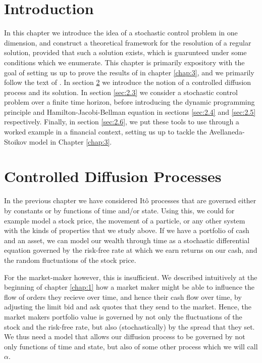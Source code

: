 \section{Introduction}
In this chapter we introduce the idea of a stochastic control problem in one dimension, 
and construct a theoretical framework for the resolution of a regular solution, 
provided that such a solution exists, which is guarunteed under some conditions which
we enumerate. This chapter is primarily expository with the goal of setting us up 
to prove the results of \cite{AS2008} in chapter \ref{chap:3}, and we primarily follow 
the text of \cite{Pham}. In section \ref{sec:2.2} 
we introduce the notion of a controlled diffusion process and its solution. In section 
\ref{sec:2.3} we consider a stochastic control problem over a finite time horizon, 
before introducing the dynamic programming principle and Hamilton-Jacobi-Bellman 
equation in sections \ref{sec:2.4} and \ref{sec:2.5} respectively. Finally, in section 
\ref{sec:2.6}, we put these tools to use through a worked example in a financial 
context, setting us up to tackle the Avellaneda-Stoikov model in Chapter \ref{chap:3}.

\section{Controlled Diffusion Processes}\label{sec:2.2}

In the previous chapter we have considered It\^{o} processes that are governed either by constants or by
functions of time and/or state. Using this, we could for example model a stock price, the movement of a particle,
or any other system with the kinds of properties that we study above. If we have a portfolio of cash 
and an asset, we can model our wealth through time as a stochastic differential equation governed by the 
risk-free rate at which we earn returns on our cash, and the random fluctuations of the stock price. 

For the market-maker however, this is insufficient. We described intuitively at the beginning of chapter \ref{chap:1}
how a market maker might be able to influence the flow of orders they recieve over time, and hence their 
cash flow over time, by adjusting the limit bid and ask quotes that they send to the market. Hence,
the market makers portfolio value is governed by not only the fluctuations of the stock and the risk-free
rate, but also (stochastically) by the spread that they set. We thus need a model that allows our diffusion
process to be governed by not only functions of time and state, but also of some other process which we 
will call $\alpha$.

